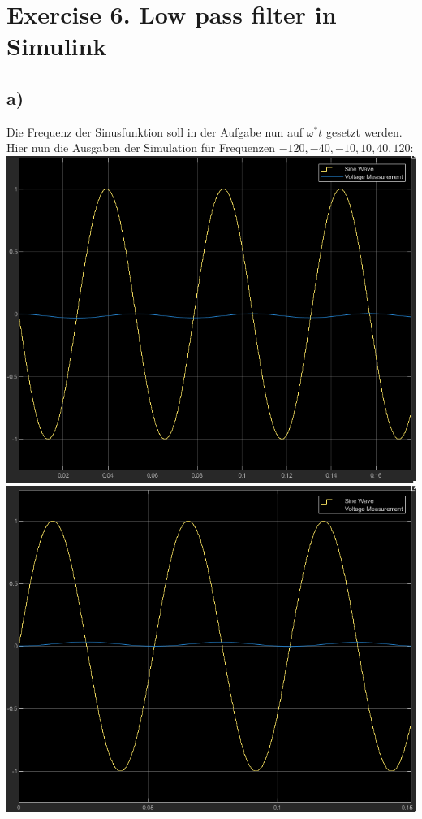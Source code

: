 \documentclass{scrartcl}
\begin{document}
\section*{Exercise 6. Low pass filter in Simulink}
\subsection*{a)}
Die Frequenz der Sinusfunktion soll in der Aufgabe nun auf $\omega^*t$ gesetzt werden.
Hier nun die Ausgaben der Simulation für Frequenzen $-120,-40,-10,10,40,120$:\\
\includegraphics[scale=0.4]{lowpass_sim_out1.png}
\includegraphics[scale=0.4]{lowpass_sim_out11.png}\\
\end{document}
